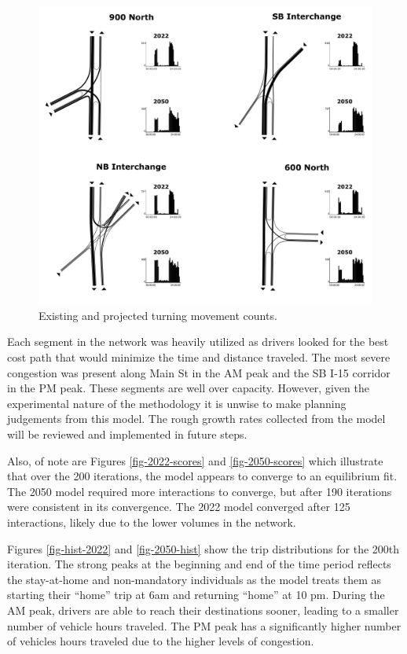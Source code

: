 \documentclass[
  letterpaper,
  DIV=11,
  numbers=noendperiod]{scrartcl}
\begin{document}
\begin{figure}

{\centering \includegraphics{figures/matsim_intersections/VIA_diagram.png}

}

\caption{\label{fig-via}Existing and projected turning movement counts.}

\end{figure}

Each segment in the network was heavily utilized as drivers looked for
the best cost path that would minimize the time and distance traveled.
The most severe congestion was present along Main St in the AM peak and
the SB I-15 corridor in the PM peak. These segments are well over
capacity. However, given the experimental nature of the methodology it
is unwise to make planning judgements from this model. The rough growth
rates collected from the model will be reviewed and implemented in
future steps.

Also, of note are Figures \ref{fig-2022-scores} and
\ref{fig-2050-scores} which illustrate that over the 200 iterations, the
model appears to converge to an equilibrium fit. The 2050 model required
more interactions to converge, but after 190 iterations were consistent
in its convergence. The 2022 model converged after 125 interactions,
likely due to the lower volumes in the network.

Figures \ref{fig-hist-2022} and \ref{fig-2050-hist} show the trip
distributions for the 200th iteration. The strong peaks at the beginning
and end of the time period reflects the stay-at-home and non-mandatory
individuals as the model treats them as starting their ``home'' trip at
6am and returning ``home'' at 10 pm. During the AM peak, drivers are
able to reach their destinations sooner, leading to a smaller number of
vehicle hours traveled. The PM peak has a significantly higher number of
vehicles hours traveled due to the higher levels of congestion.
\end{document}
